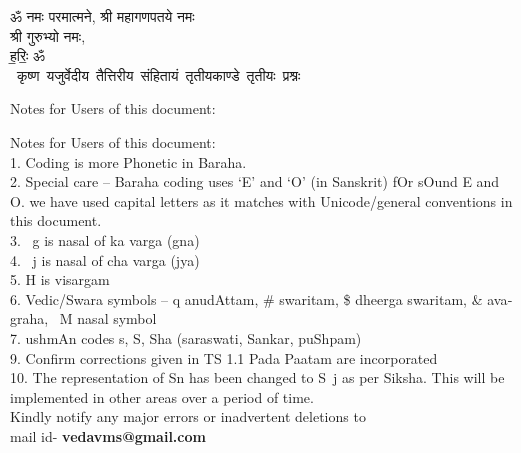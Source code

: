 \begin{titlepage}
    \begin{center}
 
\begin{sanskrit}
    { \Large
    ॐ नमः परमात्मने, श्री महागणपतये नमः\\ 
    श्री गुरुभ्यो नमः,\\
     ह॒रिः॒ ॐ 
    }
    \\
    \vspace{2.5cm}
    \mbox{ \Large
    कृष्ण यजुर्वेदीय तैत्तिरीय संहितायं तृतीयकाण्डे तृतीयः प्रश्नः 
    }
    
\end{sanskrit}
\end{center}

\end{titlepage}

\pagebreak

\begin{english}
    
    
    {
    
        Notes for Users of this document:\newline%
    
        Notes for Users of this document: \\
        1. Coding is more Phonetic in Baraha. \\
        2. Special care – Baraha coding uses ‘E’ and ‘O’ (in Sanskrit) fOr sOund E and O. we have used capital letters as it matches with Unicode/general conventions in this document. \\
        3. ~g is nasal of ka varga (gna) \\
        4. ~j is nasal of cha varga (jya) \\
        5. H is visargam \\
        6.  Vedic/Swara symbols – q anudAttam, \# swaritam, \$ dheerga swaritam, \& avagraha,  ~M nasal symbol \\
        7.  ushmAn codes s, S, Sha (saraswati, Sankar, puShpam) \\
        9. Confirm corrections given in TS 1.1 Pada Paatam are incorporated \\
        10. The representation of Sn has been changed to S~j as per Siksha. This will be implemented in other areas over a period of time. \\
    
    Kindly notify any major errors or inadvertent deletions to \\
    mail id- \textbf{vedavms@gmail.com}
    }
    \end{english}\par
\pagebreak

\tableofcontents

\pagebreak


